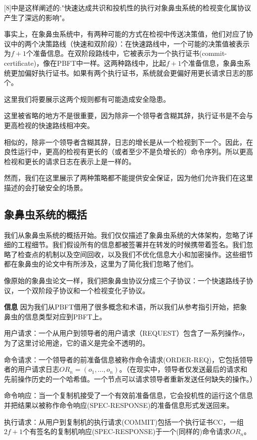\documentclass[UTF8]{ctexart}
\begin{document}
[8]中是这样阐述的:"快速达成共识和投机性的执行对象鼻虫系统的检视变化属协议产生了深远的影响"。

事实上，在象鼻虫系统中，有两种可能的方式在检视中传送决策值，他们对应了协议中的两个决策路线（快速和双阶段）：在快速路线中，一个可能的决策值被表示为$f + 1$个准备信息。在双阶段路线中，它被表示为一个执行证书(commit-certificate)，像在PBFT中一样。这两种路线中，比起$f + 1$个准备信息，象鼻虫系统更加偏好执行证书。如果有两个执行证书，系统就会更偏好用更长请求日志的那个。

这里我们将要展示这两个规则都有可能造成安全隐患。

这里被省略的地方不是很重要，因为除非一个领导者含糊其辞，执行证书是不会与更高检视的快速路线相冲突。

相似的，除非一个领导者含糊其辞，日志的增长是从一个检视到下一个。因此，在良性运行中，更高的检视有更长的（或者至少不是负增长的）命令序列。所以更高检视和更长的请求日志在表示上是一样的。

然而，我们在这里展示了两种策略都不能提供安全保证，因为他们允许我们在这里描述的会打破安全的场景。

\subsection{象鼻虫系统的概括}
我们从象鼻虫系统的概括开始。我们仅仅描述了象鼻虫系统的大体架构，忽略了详细的工程细节。我们假设所有的信息都被签署并在转发的时候携带着签名。我们忽略了检查点的机制以及空间回收，以及我们不优化信息大小和加密操作。这些细节都在象鼻虫的论文中有所涉及，这里为了简化我们忽略了他们。

像原始的象鼻虫论文一样，我们把象鼻虫协议分成三个子协议：一个快速路线子协议，一个双阶段子协议和一个检视变化子协议。


\textbf{信息} \hspace{3mm} 因为我们从PBFT借用了很多概念和术语，所以我们从参考指引开始，把象鼻虫的信息类型对应到PBFT上。

用户请求：一个从用户到领导者的用户请求（REQUEST）包含了一系列操作$o$，为了这里讨论用途，它的语义是完全不透明的。

命令请求：一个领导者的前准备信息被称作命令请求(ORDER-REQ)，它包括领导者的用户请求日志$OR_n = (o_1, \ldots, o_n)$。（在现实中，领导者仅发送最后的请求和先前操作历史的一个哈希值。一个节点可以请求领导者重新发送任何缺失的操作。）

命令响应：当一个复制机接受了一个有效前准备信息，它会投机性的运行这个信息并把结果以被称作命令响应(SPEC-RESPONSE)的准备信息形式发送回来。

执行请求：从用户到复制机的执行请求(COMMIT)包括一个执行证书CC，一组$2f + 1$个有签名的复制机响应(SPEC-RESPONSE)于一个(同样的)命令请求$OR_n$。
\end{document}

